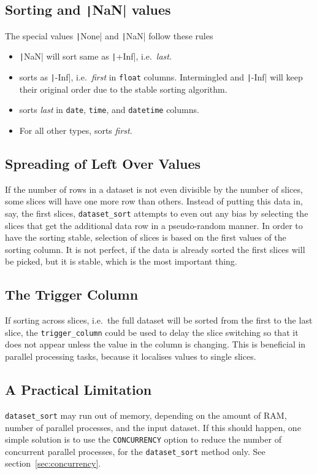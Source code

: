 \subsection{Sorting \pyNone and \texttt|NaN| values}
The special values \texttt|None| and \texttt|NaN| follow these rules
\begin{itemize}
\item \texttt|NaN| will sort same as \texttt|+Inf|, i.e.\ \textsl{last}.
\item \pyNone sorts as \texttt|-Inf|, i.e.\ \textsl{first} in \texttt{float} columns.  Intermingled \pyNone and \texttt|-Inf| will keep their original order due to the stable sorting algorithm.
\item \pyNone sorts \textsl{last} in \texttt{date}, \texttt{time}, and \texttt{datetime} columns.
\item For all other types, \pyNone sorts \textsl{first}.
\end{itemize}


\subsection{Spreading of Left Over Values}
If the number of rows in a dataset is not even divisible by the number
of slices, some slices will have one more row than others.  Instead of
putting this data in, say, the first slices, \texttt{dataset\_sort}
attempts to even out any bias by selecting the slices that get the
additional data row in a pseudo-random manner.  In order to have the
sorting stable, selection of slices is based on the first values of
the sorting column.  It is not perfect, if the data is already sorted
the first slices will be picked, but it is stable, which is the most
important thing.



\subsection{The Trigger Column}
If sorting across slices, i.e.\ the full dataset will be sorted from
the first to the last slice, the \texttt{trigger\_column} could be
used to delay the slice switching so that it does not appear unless
the value in the column is changing.  This is beneficial in parallel
processing tasks, because it localises values to single slices.



\subsection{A Practical Limitation}
\texttt{dataset\_sort} may run out of memory, depending on the amount
of RAM, number of parallel processes, and the input dataset.  If this
should happen, one simple solution is to use the \texttt{CONCURRENCY}
option to reduce the number of concurrent parallel processes, for the
\texttt{dataset\_sort} method only.  See
section~\ref{sec:concurrency}.

